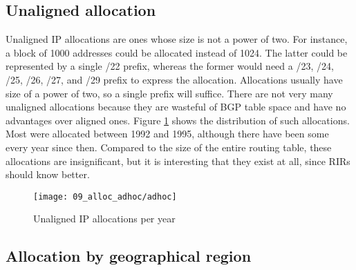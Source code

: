 \subsection{Unaligned allocation}
Unaligned IP allocations are ones whose size is not a power of two. For instance, a block of 1000 addresses could be allocated instead of 1024. The latter could be represented by a single /22 prefix, whereas the former would need a /23, /24, /25, /26, /27, and /29 prefix to express the allocation. Allocations usually have size of a power of two, so a single prefix will suffice. There are not very many unaligned allocations because they are wasteful of BGP table space and have no advantages over aligned ones. Figure \ref{fig:unaligned IP allocations} shows the distribution of such allocations. Most were allocated between 1992 and 1995, although there have been some every year since then. Compared to the size of the entire routing table, these allocations are insignificant, but it is interesting that they exist at all, since RIRs should know better.
\begin{figure}[htbp]
 	\centering
 		\texttt{[image: 09\_alloc\_adhoc/adhoc]}
	\caption{Unaligned IP allocations per year}
 	\label{fig:unaligned IP allocations}
\end{figure}
\subsection{Allocation by geographical region}

